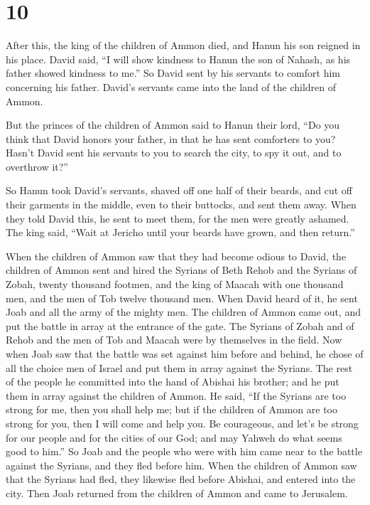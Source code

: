 \hypertarget{section-9}{%
\section{10}\label{section-9}}

 After this, the king of the children of Ammon died, and
Hanun his son reigned in his place.  David said, ``I will
show kindness to Hanun the son of Nahash, as his father showed kindness
to me.'' So David sent by his servants to comfort him concerning his
father. David's servants came into the land of the children of Ammon.

 But the princes of the children of Ammon said to Hanun
their lord, ``Do you think that David honors your father, in that he has
sent comforters to you? Hasn't David sent his servants to you to search
the city, to spy it out, and to overthrow it?''

 So Hanun took David's servants, shaved off one half of
their beards, and cut off their garments in the middle, even to their
buttocks, and sent them away.  When they told David this,
he sent to meet them, for the men were greatly ashamed. The king said,
``Wait at Jericho until your beards have grown, and then return.''

 When the children of Ammon saw that they had become
odious to David, the children of Ammon sent and hired the Syrians of
Beth Rehob and the Syrians of Zobah, twenty thousand footmen, and the
king of Maacah with one thousand men, and the men of Tob twelve thousand
men.  When David heard of it, he sent Joab and all the
army of the mighty men.  The children of Ammon came out,
and put the battle in array at the entrance of the gate. The Syrians of
Zobah and of Rehob and the men of Tob and Maacah were by themselves in
the field.  Now when Joab saw that the battle was set
against him before and behind, he chose of all the choice men of Israel
and put them in array against the Syrians.  The rest of
the people he committed into the hand of Abishai his brother; and he put
them in array against the children of Ammon.  He said,
``If the Syrians are too strong for me, then you shall help me; but if
the children of Ammon are too strong for you, then I will come and help
you.  Be courageous, and let's be strong for our people
and for the cities of our God; and may Yahweh do what seems good to
him.''  So Joab and the people who were with him came
near to the battle against the Syrians, and they fled before him.
 When the children of Ammon saw that the Syrians had
fled, they likewise fled before Abishai, and entered into the city. Then
Joab returned from the children of Ammon and came to Jerusalem.

